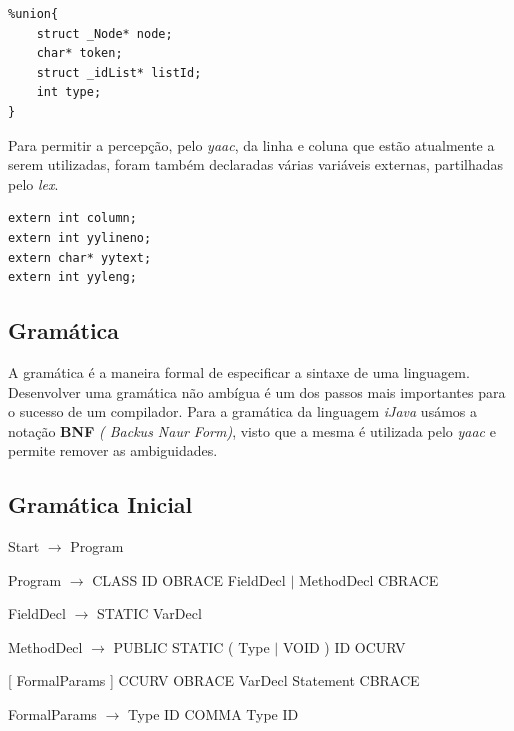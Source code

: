 \documentclass[12pt]{article}
\begin{document}
\begin{lstlisting}
%union{
    struct _Node* node;
    char* token;
    struct _idList* listId;
    int type;
}
\end{lstlisting}   

\par Para permitir a percepção, pelo \emph{yaac}, da linha e coluna que estão atualmente a serem utilizadas, foram também declaradas várias variáveis externas, partilhadas pelo \emph{lex}.
\lstset{language=c,caption=Variáveis externas,label=Estruturas2}
\begin{lstlisting}
extern int column;
extern int yylineno;
extern char* yytext;
extern int yyleng;
\end{lstlisting}  


\subsection{Gramática}

A gramática é a maneira formal de especificar a sintaxe de uma linguagem. 
Desenvolver uma gramática não ambígua é um dos passos mais importantes para o sucesso de um compilador. Para a gramática da linguagem \emph{iJava} usámos a notação \textbf{BNF} \emph{( Backus Naur Form)}, visto que a mesma é utilizada pelo \emph{yaac} e permite remover as ambiguidades. 


\subsection{Gramática Inicial}

\vspace{0.5cm}

\hspace{-1cm}Start $\rightarrow$ Program

\hspace{-1cm}Program $\rightarrow$ CLASS ID OBRACE { FieldDecl $\mid$ MethodDecl } CBRACE

\hspace{-1cm}FieldDecl $\rightarrow$ STATIC VarDecl

\hspace{-1cm}MethodDecl $\rightarrow$ PUBLIC STATIC ( Type $\mid$ VOID ) ID OCURV

[ FormalParams ] CCURV OBRACE { VarDecl } { Statement } CBRACE

\hspace{-1cm}FormalParams $\rightarrow$ Type ID { COMMA Type ID }
\end{document}
